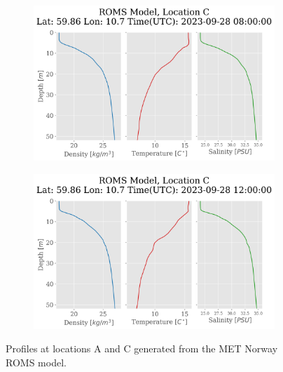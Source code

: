 \documentclass[a4paper,10pt,english]{article}
\begin{document}
\begin{figure}[H]
\begin{adjustwidth}{-2.5cm}{-2.5cm}
            \begin{subfigure}{0.65\textwidth}
                \centering
                \includegraphics[width=.9\linewidth]{../figures/model_profiles/model_profiles_C_2023_09_28_08.png}
                \caption{}
                \label{fig:model_C08}
            \end{subfigure}%
            \begin{subfigure}{0.65\textwidth}
                \centering
                \includegraphics[width=.9\linewidth]{../figures/model_profiles/model_profiles_C_2023_09_28_12.png}
                \caption{}
                \label{fig:model_C12}
            \end{subfigure}
            \end{adjustwidth}
        
            \caption{Profiles at locations A and C generated from the MET Norway ROMS model.}
            \label{fig:model_profiles}
        \end{figure}
\end{document}
